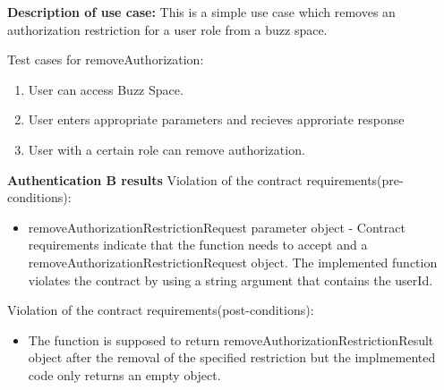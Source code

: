 \textbf{Description of use case:}\newline
This is a simple use case which removes an authorization restriction for a user role from a buzz space.


\medskip

\noindent
Test cases for removeAuthorization:
\begin{enumerate}
	\item User can access Buzz Space.
	\item User enters appropriate parameters and recieves approriate response
	\item User with a certain role can remove authorization.

\end{enumerate}

\noindent
\textbf{Authentication B results}\newline
Violation of the contract requirements(pre-conditions):
\begin{itemize}
	\item removeAuthorizationRestrictionRequest parameter object - Contract requirements indicate that the function needs to accept and a removeAuthorizationRestrictionRequest object. The implemented function violates the contract by using a string argument that contains the userId.

\end{itemize}

Violation of the contract requirements(post-conditions):
\begin{itemize}
	\item The function is supposed to return removeAuthorizationRestrictionResult object after the removal of the specified restriction but the implmemented code only returns an empty object.
\end{itemize} 